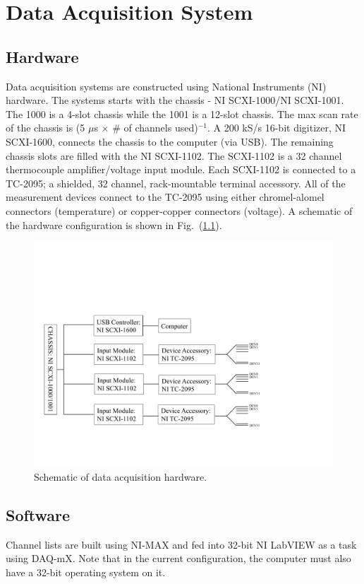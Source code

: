 \documentclass[11pt,oneside]{book}
\begin{document}
\mainmatter


\chapter{Data Acquisition System}
\label{chap:DAQ}

\section{Hardware}
Data acquisition systems are constructed using National Instruments (NI) hardware. The systems starts with the chassis - NI SCXI-1000/NI SCXI-1001. The 1000 is a 4-slot chassis while the 1001 is a 12-slot chassis. The max scan rate of the chassis is (5 $\mu$s $\times$ \# of channels used)$^{-1}$. A 200 kS/s 16-bit digitizer, NI SCXI-1600, connects the chassis to the computer (via USB). The remaining chassis slots are filled with the NI SCXI-1102. The SCXI-1102 is a 32 channel thermocouple amplifier/voltage input module. Each SCXI-1102 is connected to a TC-2095; a shielded, 32 channel, rack-mountable terminal accessory. All of the measurement devices connect to the TC-2095 using either chromel-alomel connectors (temperature) or copper-copper connectors (voltage). A schematic of the hardware configuration is shown in Fig.~(\ref{fig:daq_schem}).

\begin{figure}[h!]
\includegraphics[width=5in]{Figures/DAQ_Schematic}
\caption{Schematic of data acquisition hardware.}
\label{fig:daq_schem}
\end{figure}

\section{Software}
Channel lists are built using NI-MAX and fed into 32-bit NI LabVIEW as a task using DAQ-mX. Note that in the current configuration, the computer must also have a 32-bit operating system on it.
\end{document}
